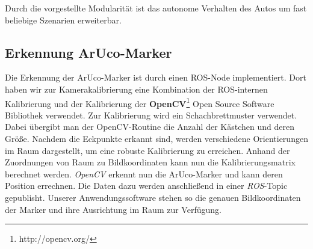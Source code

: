 Durch die vorgestellte Modularität ist das autonome Verhalten des Autos um fast beliebige Szenarien erweiterbar. 

\subsection{Erkennung ArUco-Marker}
Die Erkennung der ArUco-Marker ist durch einen ROS-Node implementiert. Dort haben wir zur Kamerakalibrierung eine Kombination der ROS-internen Kalibrierung und der Kalibrierung der  \textbf{OpenCV}\footnote[1]{http://opencv.org/} Open Source Software Bibliothek verwendet. Zur Kalibrierung wird ein Schachbrettmuster verwendet. Dabei übergibt man der OpenCV-Routine die Anzahl der Kästchen und deren Größe. Nachdem die Eckpunkte erkannt sind, werden verschiedene Orientierungen im Raum dargestellt, um eine robuste Kalibrierung zu erreichen. Anhand der Zuordnungen von Raum zu Bildkoordinaten kann nun die Kalibrierungsmatrix berechnet werden. 
\textit{OpenCV} erkennt nun die ArUco-Marker und kann deren Position errechnen. Die Daten dazu werden anschließend in einer \textit{ROS}-Topic gepublisht. Unserer Anwendungssoftware stehen so die genauen Bildkoordinaten der Marker und ihre Ausrichtung im Raum zur Verfügung.  

